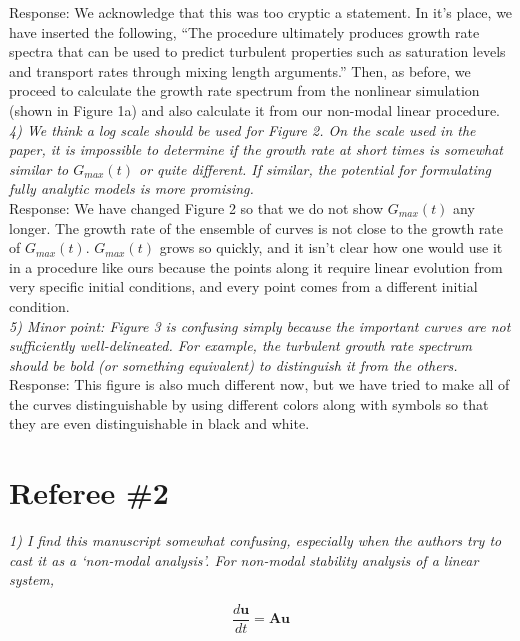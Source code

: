 \documentclass[12pt]{article}
\def\beq{\begin{equation}}
\def\eeq{\end{equation}}
\newcommand{\diff}[2]{\frac{d#1}{d#2}}
\begin{document}
Response: We acknowledge that this was too cryptic a statement. In it's place, we have inserted the following, 
``The procedure ultimately produces growth rate spectra that can be used to predict turbulent properties such as saturation levels and transport rates through mixing length arguments.''
Then, as before, we proceed to calculate the growth rate spectrum from the nonlinear simulation (shown in Figure 1a) and also calculate it from our non-modal linear procedure. \\


\emph{4) We think a log scale should be used for Figure 2. On the scale used in the paper, it is
impossible to determine if the growth rate at short times is somewhat similar to $G_{max} (t)$
or quite different. If similar, the potential for formulating fully analytic models is more
promising.} \\

Response: We have changed Figure 2 so that we do not show $G_{max}(t)$ any longer. The growth rate of the ensemble of curves is not close to the growth rate of $G_{max}(t)$. $G_{max}(t)$  grows so quickly,
and it isn't clear how one would use it in a procedure like ours because the points along it require linear evolution from very specific initial conditions, and every point comes from a different initial condition. \\

\emph{5) Minor point: Figure 3 is confusing simply because the important curves are not
sufficiently well-delineated. For example, the turbulent growth rate spectrum should be
bold (or something equivalent) to distinguish it from the others.} \\

Response: This figure is also much different now, but we have tried to make all of the curves distinguishable by using different colors along with symbols so that they are even distinguishable in black and white.\\


\section{Referee \#2}

\emph{1) I find this manuscript somewhat confusing, especially when the authors try to cast it as a ‘non-modal analysis’. For non-modal stability analysis of a linear system,}

\beq
\diff{\mathbf{u}}{t} = \mathbf{A u} \nonumber
\eeq
\end{document}

